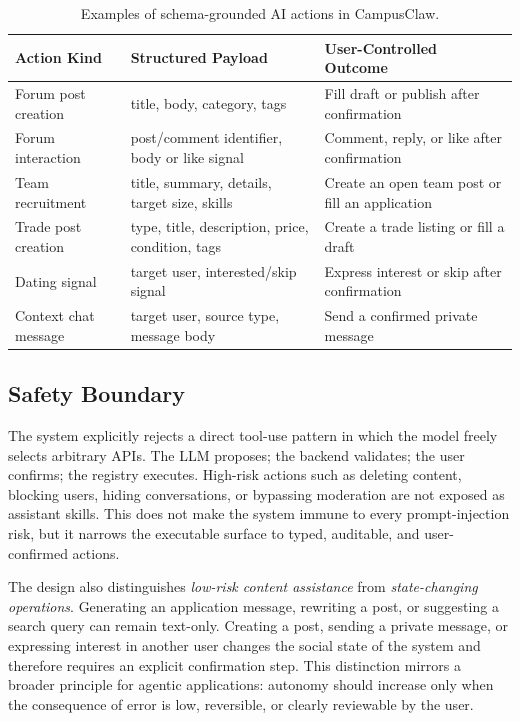 \documentclass[sigconf]{acmart}
\begin{document}
\begin{table}[t]
\centering
\caption{Examples of schema-grounded AI actions in CampusClaw.}
\label{tab:actions}
\begin{tabularx}{\textwidth}{lX X}
\toprule
\textbf{Action Kind} & \textbf{Structured Payload} & \textbf{User-Controlled Outcome}\\
\midrule
Forum post creation & title, body, category, tags & Fill draft or publish after confirmation\\
Forum interaction & post/comment identifier, body or like signal & Comment, reply, or like after confirmation\\
Team recruitment & title, summary, details, target size, skills & Create an open team post or fill an application\\
Trade post creation & type, title, description, price, condition, tags & Create a trade listing or fill a draft\\
Dating signal & target user, interested/skip signal & Express interest or skip after confirmation\\
Context chat message & target user, source type, message body & Send a confirmed private message\\
\bottomrule
\end{tabularx}
\end{table}

\subsection{Safety Boundary}
The system explicitly rejects a direct tool-use pattern in which the model freely selects arbitrary APIs. The LLM proposes; the backend validates; the user confirms; the registry executes. High-risk actions such as deleting content, blocking users, hiding conversations, or bypassing moderation are not exposed as assistant skills. This does not make the system immune to every prompt-injection risk, but it narrows the executable surface to typed, auditable, and user-confirmed actions.

The design also distinguishes \emph{low-risk content assistance} from \emph{state-changing operations}. Generating an application message, rewriting a post, or suggesting a search query can remain text-only. Creating a post, sending a private message, or expressing interest in another user changes the social state of the system and therefore requires an explicit confirmation step. This distinction mirrors a broader principle for agentic applications: autonomy should increase only when the consequence of error is low, reversible, or clearly reviewable by the user.
\end{document}

